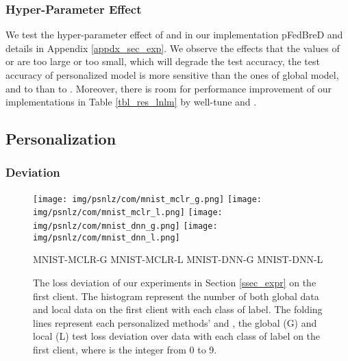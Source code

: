 \documentclass{article}
\begin{document}
\subsubsection{Hyper-Parameter Effect}
\label{sssec_pe}

We test the hyper-parameter effect of  and  in our implementation pFedBreD and details in Appendix \ref{appdx_sec_exp}. We observe the effects that the values of  or  are too large or too small, which will degrade the test accuracy, the test accuracy of personalized model is more sensitive than the ones of global model, and to  than to . Moreover, there is room for performance improvement of our implementations in Table \ref{tbl_res_lnlm} by well-tune  and .

\subsection{Personalization}
\label{ssec_personalization}

\subsubsection{Deviation}

\begin{figure}[t]
    \centering
    \texttt{[image: img/psnlz/com/mnist\_mclr\_g.png]}
    \texttt{[image: img/psnlz/com/mnist\_mclr\_l.png]}
    \texttt{[image: img/psnlz/com/mnist\_dnn\_g.png]}
    \texttt{[image: img/psnlz/com/mnist\_dnn\_l.png]}
    \begin{center}
        \footnotesize 
        MNIST-MCLR-G \qquad\qquad\qquad MNIST-MCLR-L \qquad\qquad\qquad
        MNIST-DNN-G \qquad\qquad\qquad MNIST-DNN-L
    \end{center}
   
   
   
   
   
   
   
   
   
   
   
   
    \caption{The loss deviation of our experiments in Section \ref{ssec_expr} on the first client. The histogram represent the number of both global data and local data on the first client with each class of label. The folding lines represent each personalized methods'  and , the global (G) and local (L) test loss deviation over data with each class of label on the first client, where  is the integer from 0 to 9.}
    \label{fig_deviation}
\end{figure}
\end{document}
